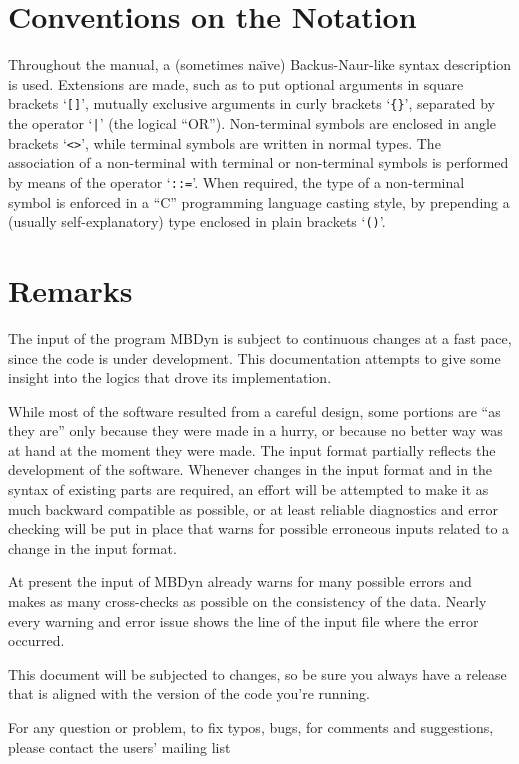 \documentclass[10pt,dvips]{report}
\begin{document}
\section*{Conventions on the Notation}
Throughout the manual, a (sometimes na\"{\i}ve) 
Backus-Naur-like syntax description is used. 
Extensions are made, such as to put optional arguments in square brackets
`\texttt{[]}', mutually exclusive arguments in curly brackets `\texttt{\{\}}',
separated by the operator `\texttt{|}' (the logical ``OR'').
Non-terminal symbols are enclosed in angle brackets `\texttt{<>}', while
terminal symbols are written in normal types.
The association of a non-terminal with terminal or non-terminal
symbols is performed by means of the operator `\texttt{::=}'. 
When required, the type of a non-terminal symbol is enforced in a ``C''
programming language casting style, by prepending a (usually
self-explanatory) type enclosed in plain brackets `\texttt{()}'.


\section*{Remarks}
The input of the program MBDyn is subject to continuous changes
at a fast pace, since the code is under development.
This documentation attempts to give some insight into the logics 
that drove its implementation.

While most of the software resulted from a careful design, 
some portions are ``as they are'' only because they were made in a hurry, 
or because no better way was at hand at the moment they were made.
The input format partially reflects the development of the software.
Whenever changes in the input format and in the syntax 
of existing parts are required, an effort will be attempted to make 
it as much backward compatible as possible, or at least reliable 
diagnostics and error checking will be put in place that warns 
for possible erroneous inputs related to a change in the input format. 

At present the input of MBDyn already warns for many possible errors 
and makes as many cross-checks as possible on the consistency of the data. 
Nearly every warning and error issue shows the line of the input file 
where the error occurred. 

This document will be subjected to changes, so be sure you always have 
a release that is aligned with the version of the code you're running.

For any question or problem, to fix typos, bugs, for comments and
suggestions, please contact the users' mailing list
\end{document}
